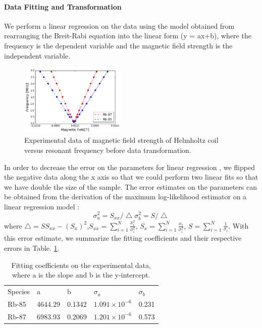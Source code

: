 \documentclass[iop,revtex4]{emulateapj_mod}
\begin{document}
\paragraph{Data Fitting and Transformation}
\par We perform a linear regression on the data using the model obtained from rearranging the Breit-Rabi equation into the linear form (y = ax+b), where the frequency is the dependent variable and the magnetic field strength is the independent variable.
\begin{figure}[h]
\includegraphics[width=0.45\textwidth]{plots/all_data.png}
\caption{Experimental data of magnetic field strength of Helmholtz coil versus resonant frequency before data transformation.}
\label{linear_fit}
\end{figure}
\par In order to decrease the error on the parameters for linear regression , we flipped the negative data along the x axis so that we could perform two linear fits so that we have double the size of the sample. The error estimates on the parameters can be obtained from the derivation of the  maximum log-likelihood estimator on a linear regression model \citep{num_rec}:
\begin{equation}
\sigma_a ^2 = S_{xx}/\bigtriangleup
\sigma_b^2 = S/\bigtriangleup
\end{equation}
where $\bigtriangleup = SS_{xx}-(S_x)^2$,$ S_{xx} = \sum^N_{i=1}\frac{x_i^2}{\sigma_i^2}$, $S_x = \sum^N_{i=1}\frac{x_i}{\sigma_i^2}$, $S =\sum^N_{i=1}\frac{1}{\sigma_i} $.
With this error estimate,  we summarize the fitting coefficients and their respective errors in Table. \ref{fitting_coefficients}.
\begin{table}[]
\centering
\caption{Fitting coefficients on the experimental data, where a is the slope and b is the y-intercept. }
\label{fitting_coefficients}
\begin{tabular}{lllll}
Species & a       & b      & $\sigma_a$ & $\sigma_b$ \\
Rb-85   & 4644.29 & 0.1342 & $1.091\times 10^{-6}$ & 0.231     \\
Rb-87   & 6983.93 & 0.2069 & $1.201\times 10^{-6}$ & 0.573    
\end{tabular}
\end{table}
\end{document}
